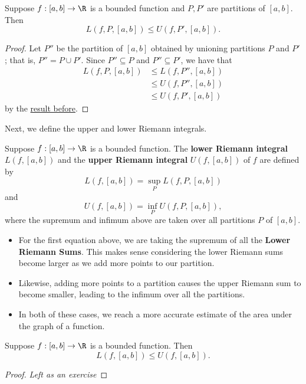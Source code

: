 \begin{prop}
    Suppose \( f: [a,b] \to \R  \) is a bounded function and \( P, P' \) are partitions of \( [a,b] \). Then 
    \[  L(f,P,[a,b]) \leq U(f,P', [a,b]). \]
\end{prop}

\begin{proof}
    Let \( P''  \) be the partition of \( [a,b] \) obtained by unioning partitions \(  P   \) and \( P' \); that is, \( P'' = P \cup P' \). Since \( P'' \subseteq P  \) and \( P'' \subseteq  P' \), we have that 
    \begin{align*}
        L(f, P, [a,b]) &\leq L(f, P'', [a,b]) \\
                       &\leq U(f, P'', [a,b]) \\
                       &\leq U(f, P', [a,b])
    \end{align*}
    by the {\hyperref[Inequalities with Riemann Sums]{result before}}.  
    \end{proof}

Next, we define the upper and lower Riemann integrals.

\begin{definition}
    Suppose \( f: [a,b] \to \R  \) is a bounded function. The \textbf{lower Riemann integral} \( L(f,[a,b]) \) and the \textbf{upper Riemann integral} \( U(f,[a,b]) \) of \( f \) are defined by 
    \[ L(f,[a,b]) = \sup_{P} L(f,P,[a,b])     \]
    and
    \[  U(f,[a,b]) = \inf_{P} U(f, P, [a,b]),  \]
    where the supremum and infimum above are taken over all partitions \( P  \) of \( [a,b] \).
\end{definition}

\begin{itemize}
    \item For the first equation above, we are taking the supremum of all the \textbf{Lower Riemann Sums}. This makes sense considering the lower Riemann sums become larger as we add more points to our partition. 
    \item Likewise, adding more points to a partition causes the upper Riemann sum to become smaller, leading to the infimum over all the partitions. 
    \item In both of these cases, we reach a more accurate estimate of the area under the graph of a function.
\end{itemize}

\begin{prop}
    Suppose \( f: [a,b] \to \R  \) is a bounded function. Then 
    \[  L(f,[a,b]) \leq U(f,[a,b]). \]
\end{prop}
\begin{proof}
\textit{Left as an exercise} 
\end{proof}

